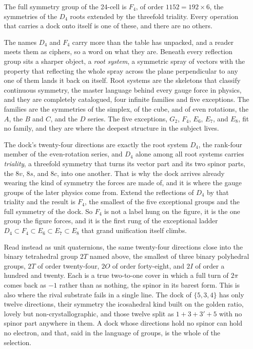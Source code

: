 \begin{result}
The full symmetry group of the 24-cell is $F_4$, of order $1152 = 192 \times 6$, the symmetries of the $D_4$ roots extended by the threefold triality. Every operation that carries a dock onto itself is one of these, and there are no others.
\end{result}

The names $D_4$ and $F_4$ carry more than the table has unpacked, and a reader meets them as ciphers, so a word on what they are. Beneath every reflection group sits a sharper object, a \textit{root system}, a symmetric spray of vectors with the property that reflecting the whole spray across the plane perpendicular to any one of them lands it back on itself. Root systems are the skeletons that classify continuous symmetry, the master language behind every gauge force in physics, and they are completely catalogued, four infinite families and five exceptions. The families are the symmetries of the simplex, of the cube, and of even rotations, the $A$, the $B$ and $C$, and the $D$ series. The five exceptions, $G_2$, $F_4$, $E_6$, $E_7$, and $E_8$, fit no family, and they are where the deepest structure in the subject lives.

The dock's twenty-four directions are exactly the root system $D_4$, the rank-four member of the even-rotation series, and $D_4$ alone among all root systems carries \textit{triality}, a threefold symmetry that turns its vector part and its two spinor parts, the $8v$, $8s$, and $8c$, into one another. That is why the dock arrives already wearing the kind of symmetry the forces are made of, and it is where the gauge groups of the later physics come from. Extend the reflections of $D_4$ by that triality and the result is $F_4$, the smallest of the five exceptional groups and the full symmetry of the dock. So $F_4$ is not a label hung on the figure, it is the one group the figure forces, and it is the first rung of the exceptional ladder $D_4 \subset F_4 \subset E_6 \subset E_7 \subset E_8$ that grand unification itself climbs.

Read instead as unit quaternions, the same twenty-four directions close into the binary tetrahedral group $2T$ named above, the smallest of three binary polyhedral groups, $2T$ of order twenty-four, $2O$ of order forty-eight, and $2I$ of order a hundred and twenty. Each is a true two-to-one cover in which a full turn of $2\pi$ comes back as $-1$ rather than as nothing, the spinor in its barest form. This is also where the rival substrate fails in a single line. The dock of $\{5,3,4\}$ has only twelve directions, their symmetry the icosahedral kind built on the golden ratio, lovely but non-crystallographic, and those twelve split as $1 + 3 + 3' + 5$ with no spinor part anywhere in them. A dock whose directions hold no spinor can hold no electron, and that, said in the language of groups, is the whole of the selection.

